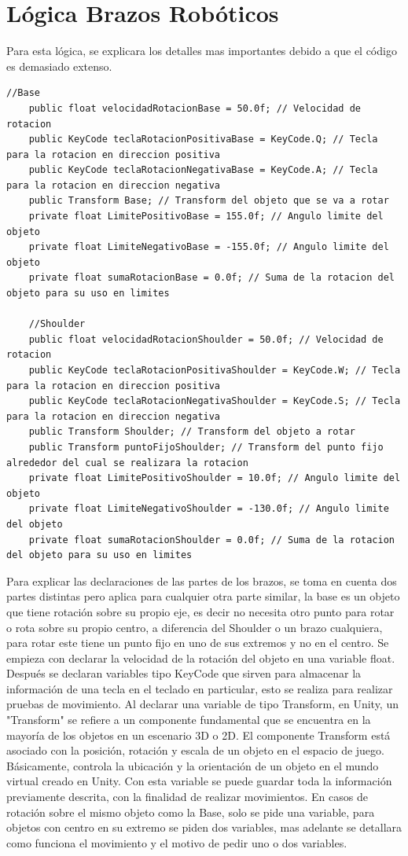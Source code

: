 \section{Lógica Brazos Robóticos}
Para esta lógica, se explicara los detalles mas importantes debido a que el código es demasiado extenso.
\begin{lstlisting}[frame=single]
   //Base
    public float velocidadRotacionBase = 50.0f; // Velocidad de rotacion
    public KeyCode teclaRotacionPositivaBase = KeyCode.Q; // Tecla para la rotacion en direccion positiva
    public KeyCode teclaRotacionNegativaBase = KeyCode.A; // Tecla para la rotacion en direccion negativa
    public Transform Base; // Transform del objeto que se va a rotar
    private float LimitePositivoBase = 155.0f; // Angulo limite del objeto
    private float LimiteNegativoBase = -155.0f; // Angulo limite del objeto
    private float sumaRotacionBase = 0.0f; // Suma de la rotacion del objeto para su uso en limites

    //Shoulder
    public float velocidadRotacionShoulder = 50.0f; // Velocidad de rotacion
    public KeyCode teclaRotacionPositivaShoulder = KeyCode.W; // Tecla para la rotacion en direccion positiva
    public KeyCode teclaRotacionNegativaShoulder = KeyCode.S; // Tecla para la rotacion en direccion negativa
    public Transform Shoulder; // Transform del objeto a rotar
    public Transform puntoFijoShoulder; // Transform del punto fijo alrededor del cual se realizara la rotacion
    private float LimitePositivoShoulder = 10.0f; // Angulo limite del objeto
    private float LimiteNegativoShoulder = -130.0f; // Angulo limite del objeto
    private float sumaRotacionShoulder = 0.0f; // Suma de la rotacion del objeto para su uso en limites
\end{lstlisting}
Para explicar las declaraciones de las partes de los brazos, se toma en cuenta dos partes distintas pero aplica para cualquier otra parte similar, la base es un objeto que tiene rotación sobre su propio eje, es decir no necesita otro punto para rotar o rota sobre su propio centro, a diferencia del Shoulder o un brazo cualquiera, para rotar este tiene un punto fijo en uno de sus extremos y no en el centro.
Se empieza con declarar la velocidad de la rotación del objeto en una variable float. Después se declaran variables tipo KeyCode que sirven para almacenar la información de una tecla en el teclado en particular, esto se realiza para realizar pruebas de movimiento.
Al declarar una variable de tipo Transform, en Unity, un "Transform" se refiere a un componente fundamental que se encuentra en la mayoría de los objetos en un escenario 3D o 2D. El componente Transform está asociado con la posición, rotación y escala de un objeto en el espacio de juego. Básicamente, controla la ubicación y la orientación de un objeto en el mundo virtual creado en Unity. Con esta variable se puede guardar toda la información previamente descrita, con la finalidad de realizar movimientos. En casos de rotación sobre el mismo objeto como la Base, solo se pide una variable, para objetos con centro en su extremo se piden dos variables, mas adelante se detallara como funciona el movimiento y el motivo de pedir uno o dos variables.
